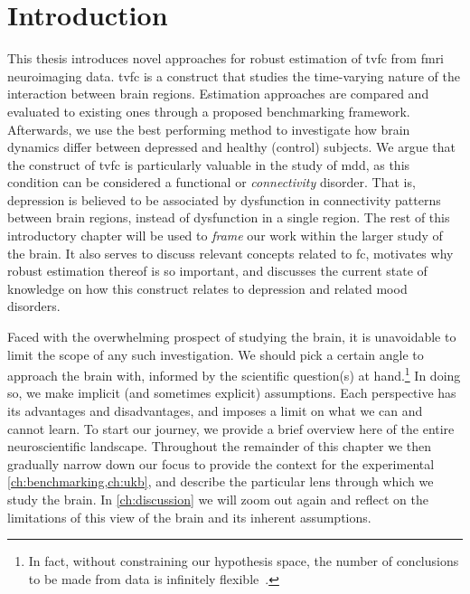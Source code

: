 \chapter{Introduction}\label{ch:introduction}

This thesis introduces novel approaches for robust estimation of \gls{tvfc} from \gls{fmri} neuroimaging data.
\Gls{tvfc} is a construct that studies the time-varying nature of the interaction between brain regions.
Estimation approaches are compared and evaluated to existing ones through a proposed benchmarking framework.
%
Afterwards, we use the best performing method to investigate how brain dynamics differ between depressed and healthy (control) subjects.
We argue that the construct of \gls{tvfc} is particularly valuable in the study of \gls{mdd}, as this condition can be considered a functional or \emph{connectivity} disorder.
That is, depression is believed to be associated by dysfunction in connectivity patterns between brain regions, instead of dysfunction in a single region.
%
The rest of this introductory chapter will be used to \emph{frame} our work within the larger study of the brain.
It also serves to discuss relevant concepts related to \gls{fc}, motivates why robust estimation thereof is so important, and discusses the current state of knowledge on how this construct relates to depression and related mood disorders.

Faced with the overwhelming prospect of studying the brain, it is unavoidable to limit the scope of any such investigation.
We should pick a certain angle to approach the brain with, informed by the scientific question(s) at hand.\footnote{In fact, without constraining our hypothesis space, the number of conclusions to be made from data is infinitely flexible~\parencite[see also][]{Gershman2021}.}
In doing so, we make implicit (and sometimes explicit) assumptions.
Each perspective has its advantages and disadvantages, and imposes a limit on what we can and cannot learn.
To start our journey, we provide a brief overview here of the entire neuroscientific landscape.
Throughout the remainder of this chapter we then gradually narrow down our focus to provide the context for the experimental \cref{ch:benchmarking,ch:ukb}, and describe the particular lens through which we study the brain.
In \cref{ch:discussion} we will zoom out again and reflect on the limitations of this view of the brain and its inherent assumptions.

